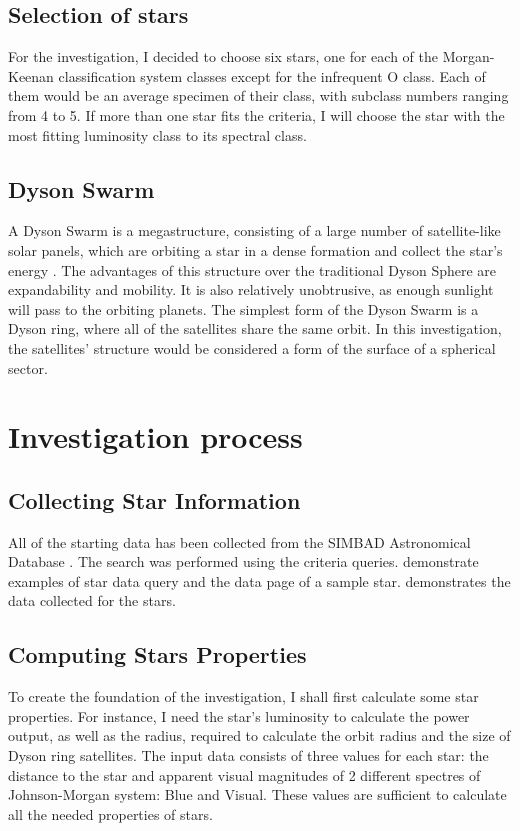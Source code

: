 \documentclass[stu, 11pt, a4paper, floatsintext, noextraspace]{apa7}
\begin{document}
	\subsection{Selection of stars}
	For the investigation, I decided to choose six stars, one for each of the Morgan-Keenan classification system classes except for the infrequent O class. Each of them would be an average specimen of their class, with subclass numbers ranging from 4 to 5. If more than one star fits the criteria, I will choose the star with the most fitting luminosity class to its spectral class.
	\subsection{Dyson Swarm}
	A Dyson Swarm is a megastructure, consisting of a large number of satellite-like solar panels, which are orbiting a star in a dense formation and collect the star's energy \Parencite{kochai_pioneering_2020}. The advantages of this structure over the traditional Dyson Sphere are expandability and mobility. It is also relatively unobtrusive, as enough sunlight will pass to the orbiting planets. The simplest form of the Dyson Swarm is a Dyson ring, where all of the satellites share the same orbit. In this investigation, the satellites' structure would be considered a form of the surface of a spherical sector.
	\section{Investigation process}
	\subsection{Collecting Star Information}
	All of the starting data has been collected from the SIMBAD Astronomical Database \Parencite{wenger_simbad_2000}. The search was performed using the criteria queries.  demonstrate examples of star data query and the data page of a sample star.  demonstrates the data collected for the stars.
	\subsection{Computing Stars Properties}
	To create the foundation of the investigation, I shall first calculate some star properties. For instance, I need the star's luminosity to calculate the power output, as well as the radius, required to calculate the orbit radius and the size of Dyson ring satellites. The input data consists of three values for each star: the distance to the star and apparent visual magnitudes of 2 different spectres of Johnson-Morgan system: Blue and Visual. These values are sufficient to calculate all the needed properties of stars.
\end{document}
